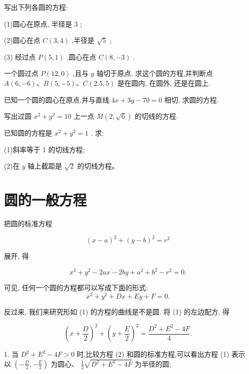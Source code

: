 \documentclass[lang=cn,newtx,10pt,scheme=chinese]{elegantbook}
\begin{document}
\begin{problemset}[练习]

\item 写出下列各圆的方程:

(1)圆心在原点, 半径是 3 ;

(2)圆心在点 \(C\left( {3,4}\right)\) ,半径是 \(\sqrt{5}\) ;

(3) 经过点 \(P\left( {5,1}\right)\) ,圆心在点 \(C\left( {8, - 3}\right)\) .

\item 一个圆过点 \(P\left( {{12},0}\right)\) ,且与 \(y\) 轴切于原点. 求这个圆的方程,并判断点 \(A\left( {6, - 6}\right) \text{、}B\left( {5, - 5}\right) \text{、}C\left( {{2.5},5}\right)\) 是在圆内, 在圆外, 还是在圆上.

\item 已知一个圆的圆心在原点,并与直线 \({4x} + {3y} - {70} = 0\) 相切. 求圆的方程.

\item 写出过圆 \({x}^{2} + {y}^{2} = {10}\) 上一点 \(M\left( {2,\sqrt{6}}\right)\) 的切线的方程.

\item 已知圆的方程是 \({x}^{2} + {y}^{2} = 1\) . 求:

(1)斜率等于 1 的切线方程;

(2)在 \(y\) 轴上截距是 \(\sqrt{2}\) 的切线方程。

\end{problemset}

\section{圆的一般方程}

把圆的标准方程

\[
    {\left( x - a\right) }^{2} + {\left( y - b\right) }^{2} = {r}^{2}
\]

展开, 得

\[
    {x}^{2} + {y}^{2} - {2ax} - {2by} + {a}^{2} + {b}^{2} - {r}^{2} = 0.
\]
\begin{definition}[圆的一般方程] 
可见, 任何一个圆的方程都可以写成下面的形式:
\[
    {x}^{2} + {y}^{2} + {Dx} + {Ey} + F = 0. \tag{1}
\]
\end{definition}
反过来, 我们来研究形如 (1) 的方程的曲线是不是圆.
将 (1) 的左边配方, 得

\[
    {\left( x + \frac{D}{2}\right) }^{2} + {\left( y + \frac{E}{2}\right) }^{2} = \frac{{D}^{2} + {E}^{2} - {4F}}{4}. \tag{2}
\]

1. 当 \({D}^{2} + {E}^{2} - {4F} > 0\) 时,比较方程 (2) 和圆的标准方程,可以看出方程 (1) 表示以 \(\left( {-\frac{D}{2}, - \frac{E}{2}}\right)\) 为圆心、 \(\frac{1}{2}\sqrt{{D}^{2} + {E}^{2} - {4F}}\) 为半径的圆;
\end{document}
